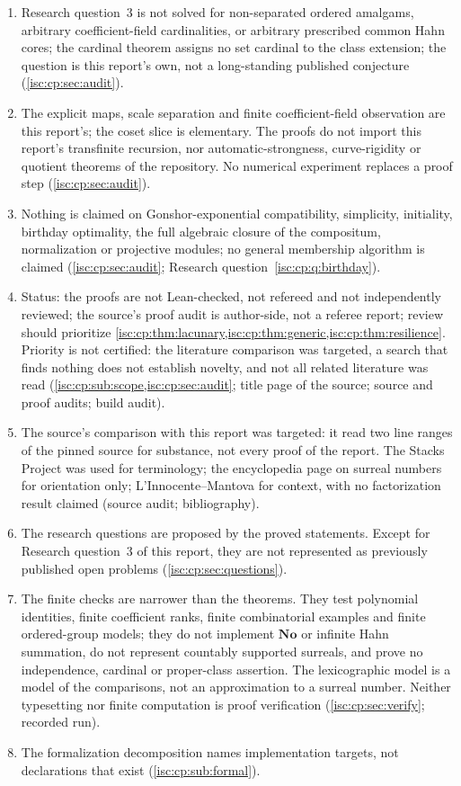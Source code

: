 \documentclass[11pt,letterpaper]{article}
\theoremstyle{definition}
\theoremstyle{remark}
\newcommand{\No}{\mathbf{No}}
\numberwithin{equation}{section}
\begin{document}
\begin{enumerate}[label=C\arabic*.,leftmargin=2.6em,itemsep=2pt]
coefficient separation: no analytic continuation to surcomplex arguments,
no complex logarithm, no exponential-compatible derivation
(\cref{isc:cp:sec:arithmetic}).
\item Research question~3 is not solved for non-separated ordered amalgams,
arbitrary coefficient-field cardinalities, or arbitrary prescribed common
Hahn cores; the cardinal theorem assigns no set cardinal to the class
extension; the question is this report's own, not a long-standing
published conjecture (\cref{isc:cp:sec:audit}).
\item The explicit maps, scale separation and finite coefficient-field
observation are this report's; the coset slice is elementary. The proofs do
not import this report's transfinite recursion, nor automatic-strongness,
curve-rigidity or quotient theorems of the repository. No numerical
experiment replaces a proof step (\cref{isc:cp:sec:audit}).
\item Nothing is claimed on Gonshor-exponential compatibility, simplicity,
initiality, birthday optimality, the full algebraic closure of the
compositum, normalization or projective modules; no general membership
algorithm is claimed (\cref{isc:cp:sec:audit}; Research
question~\ref{isc:cp:q:birthday}).
\item Status: the proofs are not Lean-checked, not refereed and not
independently reviewed; the source's proof audit is author-side, not a
referee report; review should prioritize
\cref{isc:cp:thm:lacunary,isc:cp:thm:generic,isc:cp:thm:resilience}.
Priority is not certified: the literature comparison was targeted, a
search that finds nothing does not establish novelty, and not all related
literature was read (\cref{isc:cp:sub:scope,isc:cp:sec:audit}; title page of
the source; source and proof audits; build audit).
\item The source's comparison with this report was targeted: it read two
line ranges of the pinned source for substance, not every proof of the
report. The Stacks Project was used for terminology; the encyclopedia page
on surreal numbers for orientation only; L'Innocente--Mantova for context,
with no factorization result claimed (source audit; bibliography).
\item The research questions are proposed by the proved statements. Except
for Research question~3 of this report, they are not represented as
previously published open problems (\cref{isc:cp:sec:questions}).
\item The finite checks are narrower than the theorems. They test
polynomial identities, finite coefficient ranks, finite combinatorial
examples and finite ordered-group models; they do not implement $\No$ or
infinite Hahn summation, do not represent countably supported surreals, and
prove no independence, cardinal or proper-class assertion. The
lexicographic model is a model of the comparisons, not an approximation to
a surreal number. Neither typesetting nor finite computation is proof
verification (\cref{isc:cp:sec:verify}; recorded run).
\item The formalization decomposition names implementation targets, not
declarations that exist (\cref{isc:cp:sub:formal}).
\end{enumerate}
\end{document}
